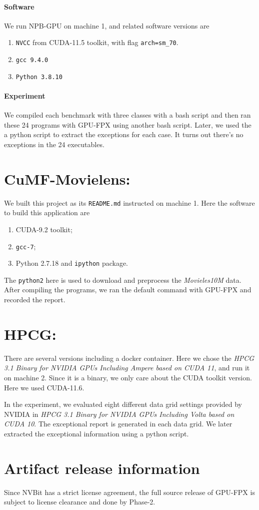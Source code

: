 \documentclass{article}
\begin{document}
	\paragraph{Software} We run NPB-GPU on machine 1, and related software versions are
	\begin{enumerate}
		\item {\tt NVCC} from CUDA-11.5 toolkit, with flag {\tt arch=sm\_70}. 
		\item {\tt gcc 9.4.0}
		\item {\tt Python 3.8.10}
	\end{enumerate}
	\paragraph{Experiment}
	We compiled each benchmark with three classes with a bash script and then ran these 24 programs with GPU-FPX using another bash script. Later, we used the a python script to extract the exceptions for each case. It turns out there's no exceptions in the 24 executables.  
	\section{CuMF-Movielens: } We built this project as its {\tt README.md} instructed on machine 1. Here the software to build this application are 
	\begin{enumerate}
		\item CUDA-9.2 toolkit;
		\item {\tt gcc-7};
		\item {Python 2.7.18} and {\tt ipython} package.
	\end{enumerate}
	The {\tt python2} here is used to download and preprocess the \textit{Movieles10M} data. After compiling the programs, we ran the default command with GPU-FPX and recorded the report.  
	\section{HPCG: } There are several versions including a docker container. Here we chose the \textit{HPCG 3.1 Binary for NVIDIA GPUs Including Ampere based on CUDA 11}, and run it on machine 2. Since it is a binary, we only care about the CUDA toolkit version. Here we used CUDA-11.6. 
	
	In the experiment, we evaluated eight different data grid settings provided by NVIDIA in \textit{HPCG 3.1 Binary for NVIDIA GPUs Including Volta based on CUDA 10}. The exceptional report is generated in each data grid. We later extracted the exceptional information using a python script. 
\section{Artifact release information}
Since NVBit has a strict license agreement, the full source release of GPU-FPX is subject to license clearance and done by Phase-2.
	
	
\end{document}
